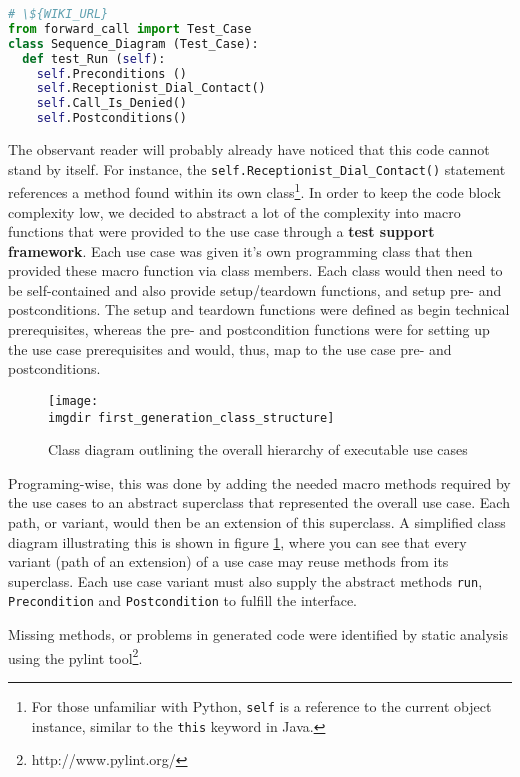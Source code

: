 \begin{lstlisting}[language=Python, caption=Example generated Python code output, label=lst:example_python_output]
# \${WIKI_URL}
from forward_call import Test_Case
class Sequence_Diagram (Test_Case):
  def test_Run (self):
    self.Preconditions ()
    self.Receptionist_Dial_Contact()
    self.Call_Is_Denied()
    self.Postconditions()

\end{lstlisting}

\noindent
The observant reader will probably already have noticed that this code cannot stand by itself. For instance, the \texttt{self.Receptionist\_Dial\_Contact()} statement references a method found within its own class\footnote{For those unfamiliar with Python, \texttt{self} is a reference to the current object instance, similar to the \texttt{this} keyword in Java.}. In order to keep the code block complexity low, we decided to abstract a lot of the complexity into macro functions that were provided to the use case through a \textbf{test support framework}. Each use case was given it's own programming class that then provided these macro function via class members. Each class would then need to be self-contained and also provide setup/teardown functions, and setup pre- and postconditions. The setup and teardown functions were defined as begin technical prerequisites, whereas the pre- and postcondition functions were for setting up the use case prerequisites and would, thus, map to the use case pre- and postconditions.\medskip
\begin{figure}[!h]
\centering
\texttt{[image: \\imgdir first\_generation\_class\_structure]}
\caption{Class diagram outlining the overall hierarchy of executable use cases}
\label{fig:first_generation_class_structure}
\end{figure}
\noindent Programing-wise, this was done by adding the needed macro methods required by the use cases to an abstract superclass that represented the overall use case. Each path, or variant, would then be an extension of this superclass. A simplified class diagram illustrating this is shown in figure \ref{fig:first_generation_class_structure}, where you can see that every variant (path of an extension) of a use case may reuse methods from its superclass. Each use case variant must also supply the abstract methods \texttt{run}, \texttt{Precondition} and \texttt{Postcondition} to fulfill the interface.\medskip

\noindent Missing methods, or problems in generated code were identified by static analysis using the pylint tool\footnote{http://www.pylint.org/}.

